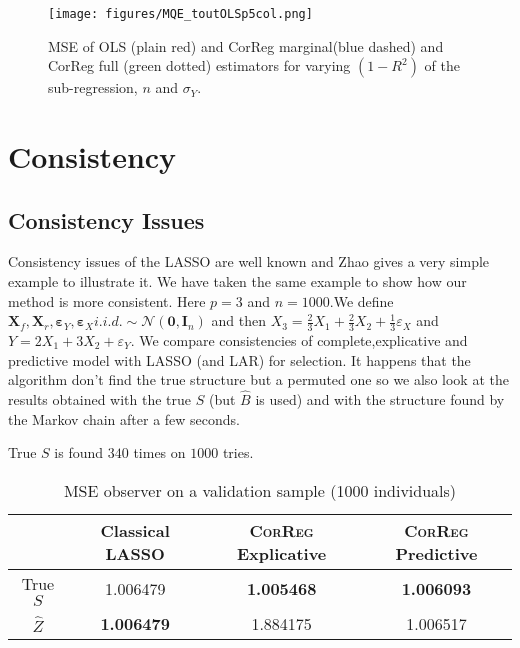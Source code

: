\documentclass[12pt,a4paper]{report}
\begin{document}
	
\begin{figure}[h!]
	\texttt{[image: figures/MQE\_toutOLSp5col.png]}\label{MQE2}
	\caption{MSE of OLS (plain red) and CorReg marginal(blue dashed) and CorReg full (green dotted) estimators for varying $(1-R^2)$ of the sub-regression, $n$ and $\sigma_Y$.}
\end{figure}	
	
	\section{Consistency}
		\subsection{Consistency Issues}\label{consistency}
		Consistency issues of the LASSO are well known and Zhao \cite{Zhao2006MSC} gives a very simple example to illustrate it.
		We have taken the same example to show how our method is more consistent.
		Here $p=3$ and $n=1000$.We define $\boldsymbol{X}_f,\boldsymbol{X}_r,\boldsymbol{\varepsilon}_Y,\boldsymbol{\varepsilon}_{X} i.i.d. \sim \mathcal{N}(\boldsymbol{0},\boldsymbol{I}_n)$ and then $X_3=\frac{2}{3}X_1+\frac{2}{3}X_2+\frac{1}{3}\varepsilon_X$ and $Y=2X_1+3X_2+\varepsilon_Y$.
		We compare consistencies of complete,explicative and predictive model with LASSO (and LAR) for selection.
		It happens that the algorithm don't find the true structure but a permuted one so we also look at the results obtained with the true $S$ (but $\hat{B}$ is used) and with the structure found by the Markov chain after a few seconds.
		
		True $S$ is found $340$ times on $1000$ tries.
		
		\begin{table}[h!]
		\centering
		\begin{tabular}{|c|c|c|c|}
		\hline 
		 & Classical LASSO & \textsc{CorReg} Explicative & \textsc{CorReg} Predictive \\ 
		\hline 
		True $S$ &  1.006479 & \textbf{1.005468} & \textbf{1.006093} \\ 
		\hline 
		$\hat{Z}$ & \textbf{1.006479} & 1.884175 & 1.006517 \\ 
		\hline 
		\end{tabular} 
		\caption{MSE observer on a validation sample (1000 individuals)}
		\end{table}
\end{document}
